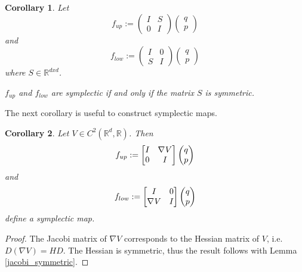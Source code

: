 \documentclass[twoside,a4paper]{article}
\newtheorem{corollary}{Corollary}
\begin{document}
\begin{corollary}
	Let
	\begin{equation*}
		f_{up} := \begin{pmatrix}
			I & S \\
			0 & I
		\end{pmatrix} \begin{pmatrix}
			q \\
			p
		\end{pmatrix}
	\end{equation*}
	and
	\begin{equation*}
		f_{low} := \begin{pmatrix}
			I & 0 \\
			S & I
		\end{pmatrix} \begin{pmatrix}
			q \\
			p
		\end{pmatrix}
	\end{equation*}
	where $S \in \mathbb{R}^{dxd}$. 

	$f_{up}$ and $f_{low}$ are symplectic if and only if the matrix $S$
	is symmetric.
\end{corollary}

The next corollary is useful to construct symplectic maps.
\begin{corollary}\label{gradient_corollary}
	Let $V \in C^2(\mathbb{R}^d, \mathbb{R})$. Then
	\begin{equation*}
		f_{up} := \begin{bmatrix}
			I & \nabla_{}{V} \\
			0 & I
		\end{bmatrix} \begin{pmatrix}
			q \\
			p
		\end{pmatrix}
	\end{equation*}
	and
	\begin{equation*}
		f_{low} := \begin{bmatrix}
			I & 0 \\
			\nabla_{}{V} & I
		\end{bmatrix} \begin{pmatrix}
			q \\
			p
		\end{pmatrix}
	\end{equation*}
	define a symplectic map.
\end{corollary}
\begin{proof}
	The Jacobi matrix of $\nabla V$ corresponds to the Hessian matrix of $V$,
	i.e. $D(\nabla V) = HD$. 
	The Hessian is symmetric, thus the result follows with Lemma \ref{jacobi_symmetric}.
\end{proof}
\end{document}
